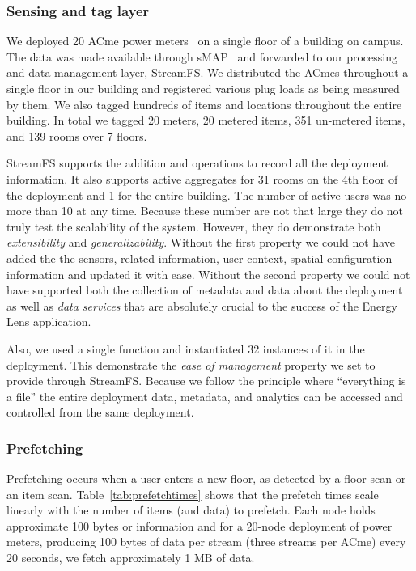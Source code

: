 \subsubsection{Sensing and tag layer}
We deployed 20 ACme power meters~\cite{ACme} on a single floor of a building on campus.  The data was made available through
sMAP~\cite{smap} and forwarded to our processing and data management layer, StreamFS.  We distributed
the ACmes throughout a single floor in our building and registered various plug loads as being measured by them.  We also tagged
hundreds of items and locations throughout the entire building.  In total we tagged 20 meters, 20 metered items, 351 un-metered items,
 and 139 rooms over 7 floors. 

StreamFS supports the addition and operations to record all the deployment information.  It also supports active aggregates for 
31 rooms on the 4th floor of the deployment and 1 for the entire building.  The number of active users was no more than 10 at any time.
Because these number are not that large they do not truly test the scalability of the system.  However, they do demonstrate
both \emph{extensibility} and \emph{generalizability}.  Without the first property we could not have added the the sensors,
related information, user context, spatial configuration information and updated it with ease.  Without the second property
we could not have supported both the collection of metadata and data about the deployment as well as \emph{data services} that
are absolutely crucial to the success of the Energy Lens application.

Also, we used a single function and instantiated 32 instances of it in the deployment.  This demonstrate the \emph{ease of management}
property we set to provide through StreamFS.  Because we follow the principle where ``everything is a file'' the entire deployment
data, metadata, and analytics can be accessed and controlled from the same deployment.

\subsubsection{Prefetching}
Prefetching occurs when a user enters a new floor, as detected by a floor scan or an item
scan.  Table~\ref{tab:prefetchtimes} shows that the prefetch times scale linearly with the number of
items (and data) to prefetch.  Each node holds approximate 100 bytes or information and for
a 20-node deployment of power meters, producing 100 bytes of data per stream (three streams per ACme) every 20 seconds, we fetch 
approximately 1 MB of data.

